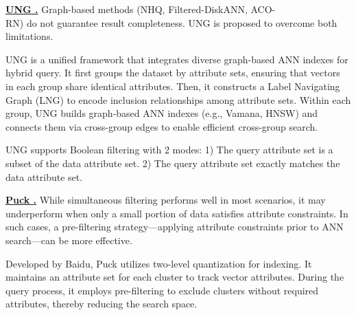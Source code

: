 \documentclass[sigconf, nonacm]{acmart}
\begin{document}
	
	\noindent\textbf{\underline{UNG \cite{UNG}.}} Graph-based methods (NHQ, Filtered-DiskANN, ACO-\\RN) do not guarantee result completeness. UNG is proposed to overcome both limitations.
	
	UNG is a unified framework that integrates diverse graph-based ANN indexes for hybrid query. It first groups the dataset by attribute sets, ensuring that vectors in each group share identical attributes. Then, it constructs a Label Navigating Graph (LNG) to encode inclusion relationships among attribute sets. Within each group, UNG builds graph-based ANN indexes (e.g., Vamana, HNSW) and connects them via cross-group edges to enable efficient cross-group search.
	
	UNG supports Boolean filtering with 2 modes:  
	1) The query attribute set is a subset of the data attribute set.  
	2) The query attribute set exactly matches the data attribute set.
	
	
	
	
	\noindent\textbf{\underline{Puck \cite{puck}.}}  
	While simultaneous filtering performs well in most scenarios, it may underperform when only a small portion of data satisfies attribute constraints. In such cases, a pre-filtering strategy—applying attribute constraints prior to ANN search—can be more effective.
	
	Developed by Baidu, Puck utilizes two-level quantization for indexing. It maintains an attribute set for each cluster to track vector attributes. During the query process, it employs pre-filtering to exclude clusters without required attributes, thereby reducing the search space.
	
\end{document}

